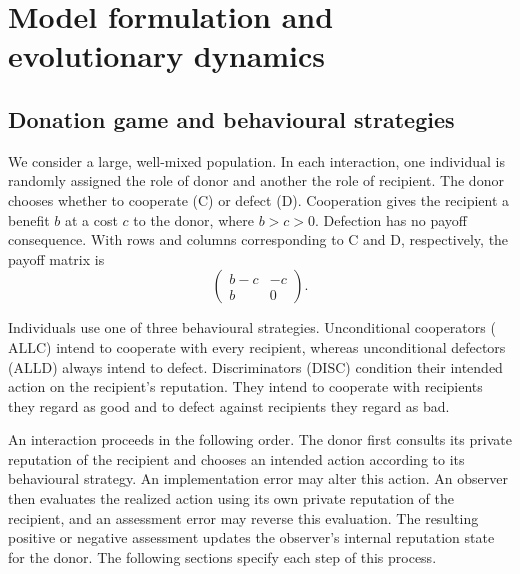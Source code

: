 \documentclass[fleqn,10pt]{wlscirep}
\begin{document}
\renewcommand{\theequation}{S\arabic{equation}}
\setcounter{equation}{0}

\renewcommand{\thefigure}{S\arabic{figure}}
\setcounter{figure}{0}




\newpage



\section{Model formulation and evolutionary dynamics}
\label{sec:si-model}

\subsection{Donation game and behavioural strategies}
\label{sec:si-game}

We consider a large, well-mixed population. In each interaction, one individual is randomly assigned the role of donor and another the role of recipient. The donor chooses whether to cooperate ($\mathrm{C}$) or defect ($\mathrm{D}$). Cooperation gives the recipient a benefit $b$ at a cost $c$ to the donor, where $b>c>0$. Defection has no payoff consequence. With rows and columns corresponding to $\mathrm{C}$ and $\mathrm{D}$, respectively, the payoff matrix is
\[
\begin{pmatrix}
b-c & -c\\
b & 0
\end{pmatrix}.
\]

Individuals use one of three behavioural strategies. Unconditional cooperators ($\mathrm{ALLC}$) intend to cooperate with every recipient, whereas unconditional defectors ($\mathrm{ALLD}$) always intend to defect. Discriminators ($\mathrm{DISC}$) condition their intended action on the recipient's reputation. They intend to cooperate with recipients they regard as good and to defect against recipients they regard as bad.

An interaction proceeds in the following order. The donor first consults its private reputation of the recipient and chooses an intended action according to its behavioural strategy. An implementation error may alter this action. An observer then evaluates the realized action using its own private reputation of the recipient, and an assessment error may reverse this evaluation. The resulting positive or negative assessment updates the observer's internal reputation state for the donor. The following sections specify each step of this process.
\end{document}
